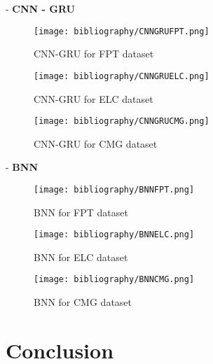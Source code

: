 \documentclass{ieeeojies}
\begin{document}
- \textbf{CNN - GRU}\\
\begin{figure}[H]
  \centering
  \begin{minipage}{0.8\linewidth}
    \centering
    \texttt{[image: bibliography/CNNGRUFPT.png]}
    \caption{CNN-GRU for FPT dataset}
    \label{fig:}
  \end{minipage}
\end{figure}
\begin{figure}[H]
  \centering
  \begin{minipage}{0.8\linewidth}
    \centering
    \texttt{[image: bibliography/CNNGRUELC.png]}
        \caption{CNN-GRU for ELC dataset}
    \label{fig:}
  \end{minipage}
\end{figure}
\begin{figure}[H]
  \centering
  \begin{minipage}{0.8\linewidth}
    \centering
    \texttt{[image: bibliography/CNNGRUCMG.png]}
        \caption{CNN-GRU for CMG dataset}
    \label{fig:}
  \end{minipage}
\end{figure}

- \textbf{BNN}\\
\begin{figure}[H]
  \centering
  \begin{minipage}{0.8\linewidth}
    \centering
    \texttt{[image: bibliography/BNNFPT.png]}
        \caption{BNN for FPT dataset}
    \label{fig:}
  \end{minipage}
\end{figure}
\begin{figure}[H]
  \centering
  \begin{minipage}{0.8\linewidth}
    \centering
    \texttt{[image: bibliography/BNNELC.png]}
            \caption{BNN for ELC dataset}
    \label{fig:}
  \end{minipage}
\end{figure}
\begin{figure}[H]
  \centering
  \begin{minipage}{0.8\linewidth}
    \centering
    \texttt{[image: bibliography/BNNCMG.png]}
            \caption{BNN for CMG dataset}
    \label{fig:}
  \end{minipage}
\end{figure}

\section{Conclusion}
\end{document}
